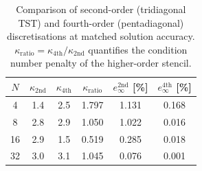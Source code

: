 \begin{table}[htbp]
  \centering
  \caption{Comparison of second-order (tridiagonal TST) and fourth-order (pentadiagonal) discretisations at matched solution accuracy. $\kappa_\mathrm{ratio} = \kappa_\mathrm{4th} / \kappa_\mathrm{2nd}$ quantifies the condition number penalty of the higher-order stencil.}
  \label{tab:order_comparison}
  \begin{tabular}{S[table-format=2.0] S[table-format=4.1] S[table-format=4.1] S[table-format=1.3] S[table-format=3.3] S[table-format=3.3]}
    \toprule
    {$N$} & {$\kappa_\mathrm{2nd}$} & {$\kappa_\mathrm{4th}$} & {$\kappa_\mathrm{ratio}$} & {$e_\infty^\mathrm{2nd}$ [\%]} & {$e_\infty^\mathrm{4th}$ [\%]} \\
     & 1.4 & 2.5 & 1.797 & 1.131 & 0.168 \\
    8 & 2.8 & 2.9 & 1.050 & 1.022 & 0.016 \\
    16 & 2.9 & 1.5 & 0.519 & 0.285 & 0.018 \\
    32 & 3.0 & 3.1 & 1.045 & 0.076 & 0.001 \\
    \bottomrule
  \end{tabular}
\end{table}
